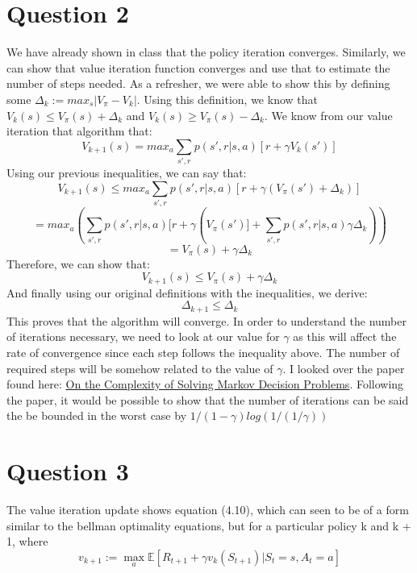 \documentclass[11pt]{article}
\begin{document}
\section*{Question 2}
We have already shown in class that the policy iteration converges. Similarly, we can show that value iteration function converges and use that to estimate the number of steps needed. As a refresher, we were able to show this by defining some $\Delta_k := max_{s} |V_{\pi} - V_k|$. Using this definition, we know that $V_k(s) \leq V_{\pi}(s) + \Delta_k$ and $V_k(s) \geq V_{\pi}(s) - \Delta_k$. We know from our value iteration that  algorithm that:
$$
V_{k+1}(s) = max_{a} \sum_{s\prime, r} p(s\prime, r| s, a)[r + \gamma V_k(s\prime)]
$$
Using our previous inequalities, we can say that:
$$
V_{k+1}(s) \leq max_{a} \sum_{s\prime, r} p(s\prime, r| s, a)[r + \gamma (V_{\pi}(s\prime) + \Delta_k)]
$$
$$
= max_{a} (\sum_{s\prime, r} p(s\prime, r| s, a)[r + \gamma (V_{\pi}(s\prime)] + \sum_{s\prime, r} p(s\prime, r| s, a)\gamma\Delta_k))
$$
$$
= V_{\pi}(s) + \gamma\Delta_k
$$
Therefore, we can show that:
$$
V_{k+1}(s) \leq V_{\pi}(s) + \gamma\Delta_k
$$
And finally using our original definitions with the inequalities, we derive:
$$
\Delta_{k+1} \leq \Delta_k
$$
This proves that the algorithm will converge. In order to understand the number of iterations necessary, we need to look at our value for $\gamma$ as this will affect the rate of convergence since each step follows the inequality above. The number of required steps will be somehow related to the value of $\gamma$. I looked over the paper found here: \href{https://www.google.com/url?sa=t&rct=j&q=&esrc=s&source=web&cd=3&ved=2ahUKEwi0lMKpoNTdAhWL0YMKHf_9CfUQFjACegQICBAC&url=https\%3A\%2F\%2Fpdfs.semanticscholar.org\%2F9146\%2F53cd6e5198c44fde8e7a24f2739214e9ae76.pdf&usg=AOvVaw3v4cwsL0o-2gsEHmpkEo7V}{\color{blue}On the Complexity of Solving Markov Decision Problems}. Following the paper, it would be possible to show that the number of iterations can be said the be bounded in the worst case by $1/ (1 - \gamma) log (1/(1/\gamma))$

\section*{Question 3}
The value iteration update shows equation (4.10), which can seen to be of a form similar to the bellman optimality equations, but for a particular policy k and k + 1, where $$v_{k+1} := \max_{a}\mathbb{E}[R_{t+1} + \gamma v_k(S_{t+1}) | S_{t} = s, A_{t} = a] $$
\end{document}
